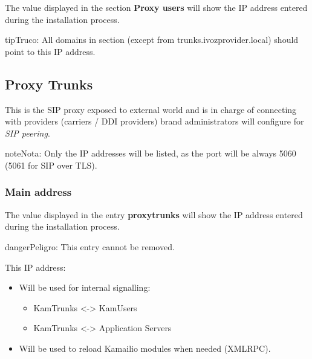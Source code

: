 \documentclass[letterpaper,10pt,spanish]{sphinxmanual}
\begin{document}
The value displayed in the section \textbf{Proxy users} will show the IP address
entered during the installation process.

\begin{notice}{tip}{Truco:}
All domains in  section (except from trunks.ivozprovider.local) should point to this IP address.
\end{notice}


\subsection{Proxy Trunks}
\label{administration_portal/platform/infrastructure/proxy_trunks:proxy-trunks}\label{administration_portal/platform/infrastructure/proxy_trunks::doc}
This is the SIP proxy exposed to external world and is in charge of connecting
with providers (carriers / DDI providers) brand administrators will configure for \emph{SIP peering}.

\begin{notice}{note}{Nota:}
Only the IP addresses will be listed, as the port will be always 5060
(5061 for SIP over TLS).
\end{notice}


\subsubsection{Main address}
\label{administration_portal/platform/infrastructure/proxy_trunks:main-address}
The value displayed in the entry \textbf{proxytrunks} will show the IP address
entered during the installation process.

\begin{notice}{danger}{Peligro:}
This entry cannot be removed.
\end{notice}

This IP address:
\begin{itemize}
\item {} 
Will be used for internal signalling:
\begin{itemize}
\item {} 
KamTrunks \textless{}-\textgreater{} KamUsers

\item {} 
KamTrunks \textless{}-\textgreater{} Application Servers

\end{itemize}

\item {} 
Will be used to reload Kamailio modules when needed (XMLRPC).

\end{itemize}
\end{document}
